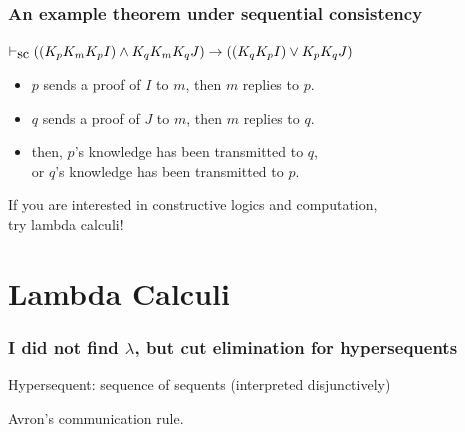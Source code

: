 \documentclass[slidestop,compress,mathserif]{beamer}
\renewcommand{\phi}{\varphi}
\begin{document}
 \begin{frame}
\frametitle{An example theorem under sequential consistency} 

 $\vdash_{\mbox{\rm sc}} ((K_p K_m K_p I) \wedge K_q K_m K_q J) \rightarrow 
 ((K_q K_p I) \vee K_p K_q J)$

\vskip 7mm

\begin{itemize}
 \item $p$ sends a proof of $I$ to $m$, then $m$ replies to $p$.
 \item $q$ sends a proof of $J$ to $m$, then $m$ replies to $q$.
 \item then, $p$'s knowledge has been transmitted to $q$,\\
       or $q$'s knowledge has been transmitted to $p$.
\end{itemize}
\end{frame}

  \begin{frame}
   \vfill
   \large
   If you are interested in constructive logics and computation,\\
   try lambda calculi!
   \vfill
  \end{frame}

  \section{Lambda Calculi}
\frame{\tableofcontents[currentsection]}
  \begin{frame}
   \frametitle{I did not find $\lambda$, but cut elimination for
   hypersequents}

   Hypersequent: sequence of sequents (interpreted disjunctively)
   \vfill

   Avron's communication rule.

   \only<2->{
   \BinaryRule
   {$\phi,\psi\vdash \phi$}
   {$\phi,\psi\vdash \psi$}
   {com'}
   {$\phi\vdash \psi\hmid\psi\vdash \varphi$}
   }

   \vfill
   \vfill
  \end{frame}
\end{document}
